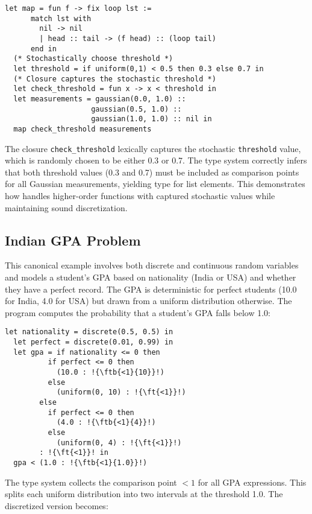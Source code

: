 \begin{lstlisting}[aboveskip=1em,belowskip=1em,escapechar=!]
  let map = fun f -> fix loop lst :=
      match lst with
        nil -> nil
        | head :: tail -> (f head) :: (loop tail)
      end in
  (* Stochastically choose threshold *)
  let threshold = if uniform(0,1) < 0.5 then 0.3 else 0.7 in
  (* Closure captures the stochastic threshold *)
  let check_threshold = fun x -> x < threshold in
  let measurements = gaussian(0.0, 1.0) :: 
                    gaussian(0.5, 1.0) :: 
                    gaussian(1.0, 1.0) :: nil in
  map check_threshold measurements
\end{lstlisting}

\noindent The closure \texttt{check\_threshold} lexically captures the stochastic \texttt{threshold} value, which is randomly chosen to be either 0.3 or 0.7. The type system correctly infers that both threshold values (0.3 and 0.7) must be included as comparison points for all Gaussian measurements, yielding type  for list elements. This demonstrates how \Slice{} handles higher-order functions with captured stochastic values while maintaining sound discretization.


\subsection{Indian GPA Problem}\label{sec:gpa}

This canonical example involves both discrete and continuous random variables and models a student's GPA based on nationality (India or USA) and whether they have a perfect record. The GPA is deterministic for perfect students (10.0 for India, 4.0 for USA) but drawn from a uniform distribution otherwise. The program computes the probability that a student's GPA falls below 1.0:

\begin{lstlisting}[aboveskip=1em,belowskip=1em,escapechar=!]
  let nationality = discrete(0.5, 0.5) in
  let perfect = discrete(0.01, 0.99) in
  let gpa = if nationality <= 0 then
          if perfect <= 0 then
            (10.0 : !{\ftb{<1}{10}}!)
          else
            (uniform(0, 10) : !{\ft{<1}}!)
        else
          if perfect <= 0 then
            (4.0 : !{\ftb{<1}{4}}!)
          else
            (uniform(0, 4) : !{\ft{<1}}!)
        : !{\ft{<1}}! in
  gpa < (1.0 : !{\ftb{<1}{1.0}}!)
\end{lstlisting}

\noindent The type system collects the comparison point $<1$ for all GPA expressions. This splits each uniform distribution into two intervals at the threshold 1.0. The discretized version becomes:

